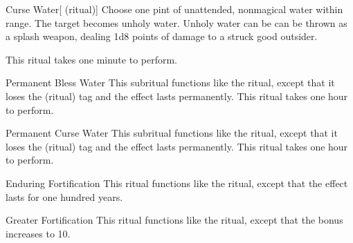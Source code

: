 \begin{ability}[\nth{1}]{Curse Water}[ (ritual)]
Choose one pint of unattended, nonmagical water within \rngclose range.
The target becomes unholy water.
Unholy water can be can be thrown as a splash weapon, dealing 1d8 points of damage to a struck good outsider.

This ritual takes one minute to perform.
\end{ability}
\vspace{0.25em}



\begin{ability}[\nth{2}]{Permanent Bless Water}
This subritual functions like the  ritual, except that it loses the  (ritual) tag and the effect lasts permanently.
This ritual takes one hour to perform.
\end{ability}
\vspace{0.25em}



\begin{ability}[\nth{2}]{Permanent Curse Water}
This subritual functions like the  ritual, except that it loses the  (ritual) tag and the effect lasts permanently.
This ritual takes one hour to perform.
\end{ability}
\vspace{0.25em}



\begin{ability}[\nth{3}]{Enduring Fortification}
This ritual functions like the  ritual, except that the effect lasts for one hundred years.
\end{ability}
\vspace{0.25em}



\begin{ability}[\nth{3}]{Greater Fortification}
This ritual functions like the  ritual, except that the  bonus increases to 10.
\end{ability}
\vspace{0.25em}



